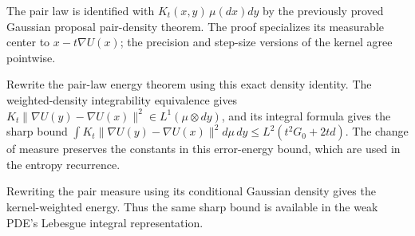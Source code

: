\documentclass[11pt,a4paper]{report}
\begin{document}
The pair law is identified with \(K_t(x,y)\,\mu(dx)dy\) by the previously proved Gaussian proposal pair-density theorem. The proof specializes its measurable center to \(x-t\nabla U(x)\); the precision and step-size versions of the kernel agree pointwise.



Rewrite the pair-law energy theorem using this exact density identity. The weighted-density integrability equivalence gives \(K_t\|\nabla U(y)-\nabla U(x)\|^2\in L^1(\mu\otimes dy)\), and its integral formula gives the sharp bound \(\int K_t\|\nabla U(y)-\nabla U(x)\|^2d\mu\,dy\le L^2(t^2G_0+2td)\). The change of measure preserves the constants in this error-energy bound, which are used in the entropy recurrence.



Rewriting the pair measure using its conditional Gaussian density gives the kernel-weighted energy. Thus the same sharp bound is available in the weak PDE's Lebesgue integral representation.
\end{document}
